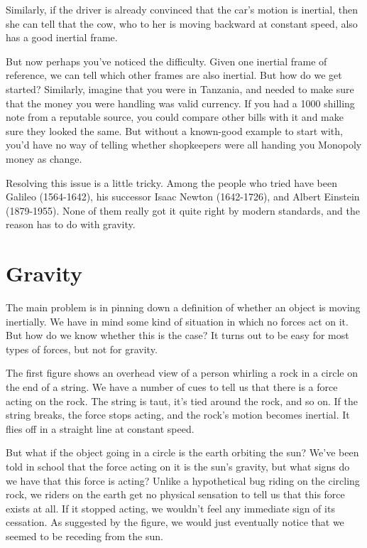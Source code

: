 Similarly, if the driver is already convinced that the car's motion is inertial, then she can tell that the cow,
who to her is moving backward at constant speed, also has a good inertial frame.

But now perhaps you've noticed the difficulty. Given one inertial frame of reference, we can tell which other
frames are also inertial. But how do we get started? Similarly, imagine that you were in Tanzania,
and needed to make sure that the money you were handling was valid currency. If you had a 1000 shilling note from
a reputable source, you could compare other bills with it and make sure they looked the same. But without a
known-good example to start with, you'd have no way of telling whether shopkeepers were all handing you Monopoly money
as change.

Resolving this issue is a little tricky. Among the people who tried have been
Galileo (1564-1642), his successor Isaac Newton (1642-1726), and
Albert Einstein (1879-1955). None of them really got it quite right by modern standards, and the reason has
to do with gravity.

\pagebreak

\section{Gravity}

The main problem is in pinning down a definition of whether an object is moving inertially. We have in mind
some kind of situation in which no forces act on it. But how do we know whether this is the case?
It turns out to be easy for most types of forces, but not for gravity.

The first figure  shows an overhead view of a person whirling a rock in a circle on the end
of a string. We have a number of cues to tell us  that there is a force acting on the rock.
The string is taut, it's tied around the rock, and so on. If the string breaks, the force stops acting,
and the rock's motion becomes inertial. It flies off in a straight line at constant speed.

\begin{figure}\label{fig:rock-on-string-and-earth}
\end{figure}

But what if the object going in a circle is the earth orbiting the sun? We've been told in school
that the force acting on it is the sun's gravity, but what signs do we have that this force is acting?
Unlike a hypothetical bug riding on the circling rock, we riders on the earth get no physical sensation
to tell us that this force exists at all.
If it stopped acting, we wouldn't feel any immediate sign of its cessation.
As suggested by the figure, we would just eventually notice that we seemed to be receding from the sun.

